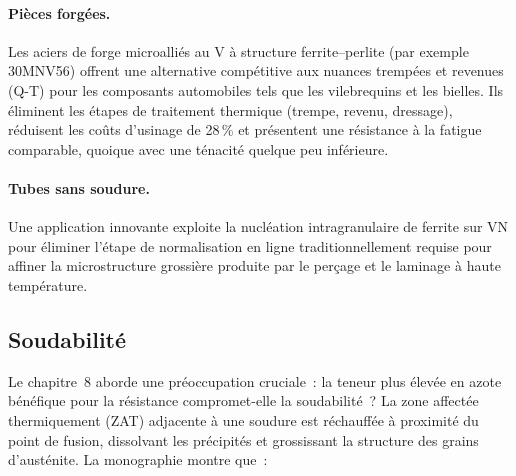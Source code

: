 \documentclass[11pt,a4paper]{article}
\begin{document}
\paragraph{Pi\`eces forg\'ees.}  Les aciers de forge microalli\'es au V
\`a structure ferrite--perlite (par exemple 30MNV56) offrent une
alternative comp\'etitive aux nuances tremp\'ees et revenues (Q-T) pour
les composants automobiles tels que les vilebrequins et les bielles.
Ils \'eliminent les \'etapes de traitement thermique (trempe, revenu,
dressage), r\'eduisent les co\^uts d'usinage de 28\,\% et pr\'esentent
une r\'esistance \`a la fatigue comparable, quoique avec une t\'enacit\'e
quelque peu inf\'erieure.

\paragraph{Tubes sans soudure.}  Une application innovante exploite la
nucl\'eation intragranulaire de ferrite sur VN pour \'eliminer l'\'etape
de normalisation en ligne traditionnellement requise pour affiner la
microstructure grossi\`ere produite par le per\c{c}age et le laminage \`a
haute temp\'erature.

\subsection{Soudabilit\'e}

Le chapitre~8 aborde une pr\'eoccupation cruciale~: la teneur plus
\'elev\'ee en azote b\'en\'efique pour la r\'esistance compromet-elle la
soudabilit\'e~?  La zone affect\'ee thermiquement (ZAT) adjacente \`a
une soudure est r\'echauff\'ee \`a proximit\'e du point de fusion,
dissolvant les pr\'ecipit\'es et grossissant la structure des grains
d'aust\'enite.  La monographie montre que~:
\end{document}
